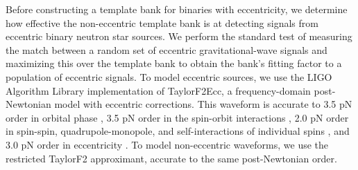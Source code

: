 Before constructing a template bank for binaries with eccentricity, we determine how effective the non-eccentric template bank is at detecting signals from eccentric binary neutron star sources. We perform the standard test of measuring the match between a random set of eccentric gravitational-wave signals and maximizing this over the template bank to obtain the bank's fitting factor to a population of eccentric signals. To model eccentric sources, we use the LIGO Algorithm Library implementation \cite{lalsuite} of TaylorF2Ecc, a frequency-domain post-Newtonian model with eccentric corrections. This waveform is accurate to 3.5 pN order in orbital phase \cite{Buonanno:2009zt}, 3.5 pN order in the spin-orbit interactions \cite{Bohe:2013cla}, 2.0 pN order in spin-spin, quadrupole-monopole, and self-interactions of individual spins \cite{Mikoczi:2005dn,Arun:2008kb}, and 3.0 pN order in eccentricity \cite{Moore:2016qxz}. To model non-eccentric waveforms, we use the restricted TaylorF2 approximant, accurate to the same post-Newtonian order.

